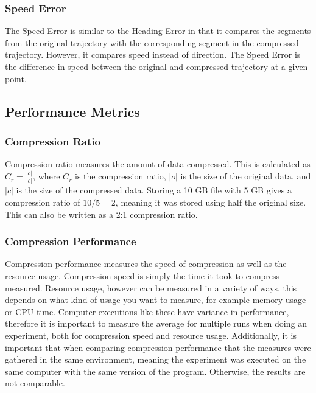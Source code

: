 \subsubsection{Speed Error}
The Speed Error is similar to the Heading Error in that it compares the segments from the original trajectory with the corresponding segment in the compressed trajectory. However, it compares speed instead of direction. The Speed Error is the difference in speed between the original and compressed trajectory at a given point.

\subsection{Performance Metrics}
\subsubsection{Compression Ratio}
Compression ratio measures the amount of data compressed. This is calculated as $C_{r} = \frac{|o|}{|c|}$, where $C_{r}$ is the compression ratio, $|o|$ is the size of the original data, and $|c|$ is the size of the compressed data. Storing a 10 GB file with 5 GB gives a compression ratio of $10 / 5 = 2$, meaning it was stored using half the original size. This can also be written as a 2:1 compression ratio.

\subsubsection{Compression Performance}
Compression performance measures the speed of compression as well as the resource usage. Compression speed is simply the time it took to compress measured. Resource usage, however can be measured in a variety of ways, this depends on what kind of usage you want to measure, for example memory usage or CPU time. Computer executions like these have variance in performance, therefore it is important to measure the average for multiple runs when doing an experiment, both for compression speed and resource usage. Additionally, it is important that when comparing compression performance that the measures were gathered in the same environment, meaning the experiment was executed on the same computer with the same version of the program. Otherwise, the results are not comparable.

